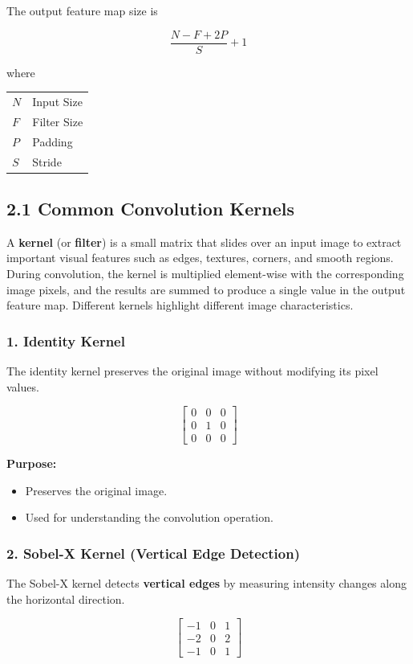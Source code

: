 \documentclass[11pt]{article}
\begin{document}
The output feature map size is

\[
\frac{N-F+2P}{S}+1
\]

where

\begin{tabular}{ll}
$N$ & Input Size\\
$F$ & Filter Size\\
$P$ & Padding\\
$S$ & Stride
\end{tabular}
\subsection*{2.1 Common Convolution Kernels}

A \textbf{kernel} (or \textbf{filter}) is a small matrix that slides over an input image to extract important visual features such as edges, textures, corners, and smooth regions. During convolution, the kernel is multiplied element-wise with the corresponding image pixels, and the results are summed to produce a single value in the output feature map. Different kernels highlight different image characteristics.

\subsubsection*{1. Identity Kernel}

The identity kernel preserves the original image without modifying its pixel values.

\[
\begin{bmatrix}
0 & 0 & 0\\
0 & 1 & 0\\
0 & 0 & 0
\end{bmatrix}
\]

\textbf{Purpose:}
\begin{itemize}
\item Preserves the original image.
\item Used for understanding the convolution operation.
\end{itemize}

\subsubsection*{2. Sobel-X Kernel (Vertical Edge Detection)}

The Sobel-X kernel detects \textbf{vertical edges} by measuring intensity changes along the horizontal direction.

\[
\begin{bmatrix}
-1 & 0 & 1\\
-2 & 0 & 2\\
-1 & 0 & 1
\end{bmatrix}
\]
\end{document}
